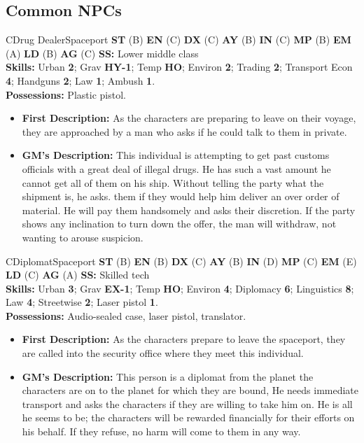 \subsection{Common NPCs}
\label{sec:common-npcs}

\begin{npc}{C}{Drug Dealer}{Spaceport}
  \textbf{ST} (B) \textbf{EN} (C) \textbf{DX} (C) \textbf{AY} (B)
  \textbf{IN} (C) \textbf{MP} (B) \textbf{EM} (A) \textbf{LD} (B)
  \textbf{AG} (C) \textbf{SS:} Lower middle class \\
  \textbf{Skills:} Urban \textbf{2}; Grav \textbf{HY-1}; Temp
  \textbf{HO}; Environ \textbf{2}; Trading \textbf{2}; Transport Econ
  \textbf{4}; Handguns \textbf{2}; Law \textbf{1}; Ambush
  \textbf{1}. \\ 
  \textbf{Possessions:} Plastic pistol. \\
\begin{itemize}
\item \textbf{First Description:} As the characters are preparing to
  leave on their voyage, they are approached by a man who asks if he
  could talk to them in private.
\item \textbf{GM's Description:} This individual is attempting to get
  past customs officials with a great deal of illegal drugs. He has
  such a vast amount he cannot get all of them on his ship. Without
  telling the party what the shipment is, he asks. them if they would
  help him deliver an over order of material. He will pay them
  handsomely and asks their discretion. If the party shows any
  inclination to turn down the offer, the man will withdraw, not
  wanting to arouse suspicion.
\end{itemize}
\end{npc}

\hrulefill

\begin{npc}{C}{Diplomat}{Spaceport}
  \textbf{ST} (B) \textbf{EN} (B) \textbf{DX} (C) \textbf{AY} (B)
  \textbf{IN} (D) \textbf{MP} (C) \textbf{EM} (E) \textbf{LD} (C)
  \textbf{AG} (A) \textbf{SS:} Skilled tech \\
  \textbf{Skills:} Urban \textbf{3}; Grav \textbf{EX-1}; Temp
  \textbf{HO}; Environ \textbf{4}; Diplomacy \textbf{6}; Linguistics
  \textbf{8}; Law \textbf{4}; Streetwise \textbf{2}; Laser
  pistol \textbf{1}. \\
  \textbf{Possessions:} Audio-sealed case, laser pistol, translator.
\begin{itemize}
\item \textbf{First Description:} As the characters prepare to leave the
  spaceport, they are called into the security office where they meet
  this individual.
\item \textbf{GM's Description:} This person is a diplomat from the
  planet the characters are on to the planet for which they are bound,
  He needs immediate transport and asks the characters if they are
  willing to take him on. He is all he seems to be; the characters
  will be rewarded financially for their efforts on his behalf. If
  they refuse, no harm will come to them in any way.
\end{itemize}
\end{npc}

